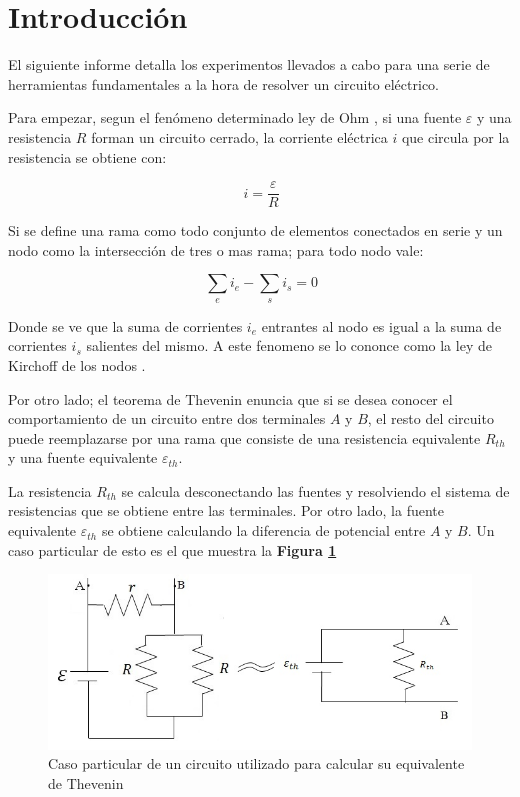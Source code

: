 \documentclass[11pt,a4paper]{article}
\begin{document}
\section{Introducción}\label{sec:intro}
El siguiente informe detalla los experimentos llevados a cabo para una serie de herramientas fundamentales a la hora de resolver un circuito eléctrico. 

\bigskip

Para empezar, segun el fenómeno determinado ley de Ohm \cite{Trelles}, si una fuente $\varepsilon$ y una resistencia $R$ forman un circuito cerrado, la corriente eléctrica $i$ que circula por la resistencia se obtiene con:

\begin{equation}\label{Ohm}
\ i= \frac{\varepsilon}{R}
\end{equation}

Si se define una rama como todo conjunto de elementos conectados en serie y un nodo como la intersección de tres o mas rama; para todo nodo vale:
 
\begin{equation}\label{nodos}
\ \sum_{e}i_{e}-\sum_{s}i_{s}=0
\end{equation}

Donde se ve que la suma de corrientes $i_{e}$ entrantes al nodo es igual a la suma de corrientes $i_{s}$ salientes del mismo. A este fenomeno se lo cononce como la ley de Kirchoff de los nodos \cite{Trelles}.

Por otro lado; el teorema de Thevenin \cite{Trelles} enuncia que si se desea conocer el comportamiento de un circuito entre dos terminales $A$ y $B$, el resto del circuito puede reemplazarse por una rama que consiste de una resistencia equivalente $R_{th}$ y una fuente equivalente $\varepsilon_{th}$.

La resistencia $R_{th}$ se calcula desconectando las fuentes y resolviendo el sistema de resistencias que se obtiene entre las terminales. Por otro lado, la fuente equivalente $\varepsilon_{th}$ se obtiene calculando la diferencia de potencial entre $A$ y $B$. Un caso particular de esto es el que muestra la \textbf{Figura \ref{fig:circ_intro}}

\begin{figure}[h]
  \centering
  \includegraphics[scale=0.55]{Circuito-Intro}
  \caption{Caso particular de un circuito utilizado para calcular su equivalente de Thevenin}
  \label{fig:circ_intro}
\end{figure}
\end{document}
